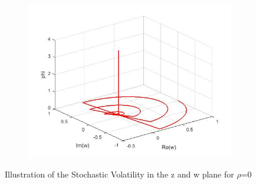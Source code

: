 \documentclass[a4paper,11pt]{article}
\begin{document}
\begin{figure}[!h]
\begin{subfigure}[c]{0.5\textwidth}
\includegraphics[width=\linewidth]{18.jpg}
\end{subfigure}
\caption{Illustration of the Stochastic Volatility in the z and w plane for $\rho$=0}
\label{z4}
\end{figure}
\end{document}
